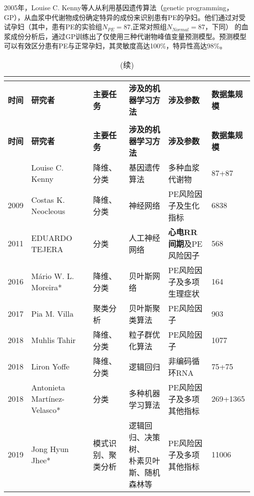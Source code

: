 2005年，Louise C. Kenny等人\cite{Kenny2005}从利用基因遗传算法（genetic programming，GP），从血浆中代谢物成份确定特异的成份来识别患有PE的孕妇。他们通过对受试孕妇（其中，患有PE的实验组$N_{PE}=87$,正常对照组$N_{Normal}=87$，下同）
的血浆成份分析后，通过GP训练出了仅使用三种代谢物峰值变量预测模型。预测模型可以有效区分患有PE与正常孕妇，其灵敏度高达100\%，特异性高达98\%。
\begin{landscape}
	\begin{longtable}{m{1cm}<{\centering}m{4cm}<{\centering}m{3cm}<{\centering}m{4.5cm}<{\centering}m{4.5cm}<{\centering}m{2cm}<{\centering}}
		\caption{基于机器学习的PE研究小结}\\
		\label{tab:AIinPE}\\
		\toprule
        \textbf{时间}&\textbf{研究者}&\textbf{主要任务}&\textbf{涉及的机器学习方法}&\textbf{涉及参数}&\textbf{数据集规模}\\
        \midrule
        \endfirsthead
        \caption[]{(续)}\\
        \midrule
        \textbf{时间}&\textbf{研究者}&\textbf{主要任务}&\textbf{涉及的机器学习方法}&\textbf{涉及参数}&\textbf{数据集规模}\\
        \midrule
        \endhead 
        \midrule
        \endfoot
        \bottomrule
        \endlastfoot
        2005&Louise C. Kenny\cite{Kenny2005}&降维、分类&基因遗传算法&多种血浆代谢物&87+87\\
        2009&Costas K. Neocleous\cite{Neocleous2009}&降维、分类&神经网络&PE风险因子及生化指标&6838\\
        2011&EDUARDO TEJERA\cite{Tejera2011}&分类&人工神经网络&\textbf{心电RR间期}及PE风险因子&568\\
        2016&Mário W. L. Moreira\cite{Moreira2016}*&降维、分类&贝叶斯网络&PE风险因子及多项生理症状&164\\
        2017&Pia M. Villa\cite{Villa2017}&聚类分析&贝叶斯聚类算法&PE风险因子&903\\
        2018&Muhlis Tahir\cite{Tahir2018,Tahir2018-2}&降维、分类&粒子群优化算法&PE风险因子&1077\\
        2018&Liron Yoffe\cite{Yoffe2018}&降维、分类&逻辑回归&非编码循环RNA&75+75\\
        2018&Antonieta Martínez-Velasco\cite{Martinez2018}*&分类&多种机器学习算法&PE风险因子及多项其他指标&269+1365\\
        2019&Jong Hyun Jhee\cite{Jhee2019}*&模式识别、聚类分析&\tabincell{c}{逻辑回归、决策树、\\朴素贝叶斯、随机森林等}&PE风险因子及多项其他指标&11006\\

\end{longtable}
\end{landscape}
